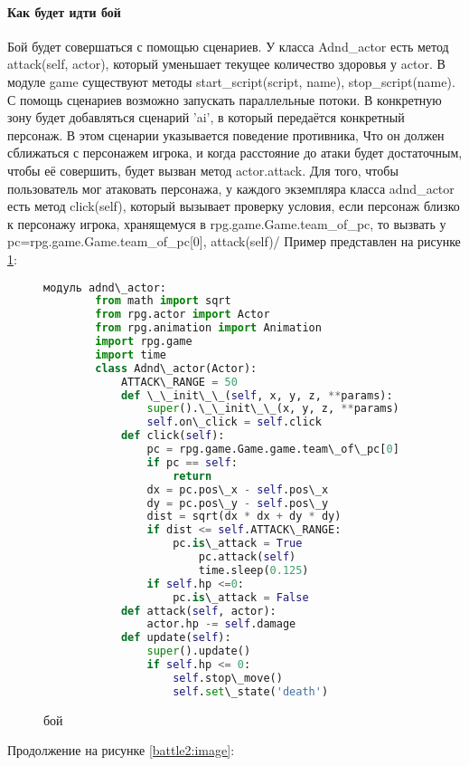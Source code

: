 \paragraph{Как будет идти бой}
Бой будет совершаться с помощью сценариев. У класса Adnd\_actor есть метод attack(self, actor), который уменьшает текущее количество здоровья у actor. В модуле game существуют методы start\_script(script, name), stop\_script(name). С помощь сценариев возможно запускать параллельные потоки. В конкретную зону будет добавляться сценарий 'ai', в который передаётся конкретный персонаж. В этом сценарии указывается поведение противника, Что он должен сближаться с персонажем игрока, и когда расстояние до атаки будет достаточным, чтобы её совершить, будет вызван метод actor.attack. Для того, чтобы пользователь мог атаковать персонажа, у каждого экземпляра класса adnd\_actor есть метод click(self), который вызывает проверку условия, если персонаж близко к персонажу игрока, хранящемуся в rpg.game.Game.team\_of\_pc, то вызвать у pc=rpg.game.Game.team\_of\_pc[0], attack(self)/
Пример представлен на рисунке \ref{battle:image}:
\begin{figure}[H]
	\begin{lstlisting}[language=Python]
		модуль adnd\_actor:
		from math import sqrt
		from rpg.actor import Actor
		from rpg.animation import Animation
		import rpg.game
		import time
		class Adnd\_actor(Actor):	
			ATTACK\_RANGE = 50
			def \_\_init\_\_(self, x, y, z, **params):
				super().\_\_init\_\_(x, y, z, **params)
				self.on\_click = self.click
			def click(self):
				pc = rpg.game.Game.game.team\_of\_pc[0]
				if pc == self:
					return
				dx = pc.pos\_x - self.pos\_x
				dy = pc.pos\_y - self.pos\_y
				dist = sqrt(dx * dx + dy * dy)
				if dist <= self.ATTACK\_RANGE:
					pc.is\_attack = True
						pc.attack(self)
						time.sleep(0.125)
				if self.hp <=0:
					pc.is\_attack = False
			def attack(self, actor):
				actor.hp -= self.damage
			def update(self):
				super().update()
				if self.hp <= 0:
					self.stop\_move()
					self.set\_state('death')
\end{lstlisting}  
\caption{бой}
\label{battle:image}
\end{figure}
Продолжение на рисунке \ref{battle2:image}:
